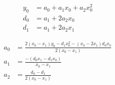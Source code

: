 \begin{align}
  y_0 & = a_0+a_1 x_0+a_2 x_0^{2}  \\
   d_0 & = a_1+2 a_2 x_0  \\
   d_1 & = a_1+2 a_2 x_1  
\end{align}

 
\begin{align}
   a_0 & = \frac
{2 \left(x_0 - x_1\right) y_0 - d_1 x_0^{2} - \left(x_0 - 2 x_1\right) d_0 x_0 }
{2 \left(x_0 - x_1\right)} \\
   a_1 & = \frac
{ - \left(d_0 x_1 - d_1 x_0 \right)}
{x_0 - x_1} \\
   a_2 & = \frac
{d_0 - d_1}
{2 \left( x_0 - x_1\right)} 
\end{align}
